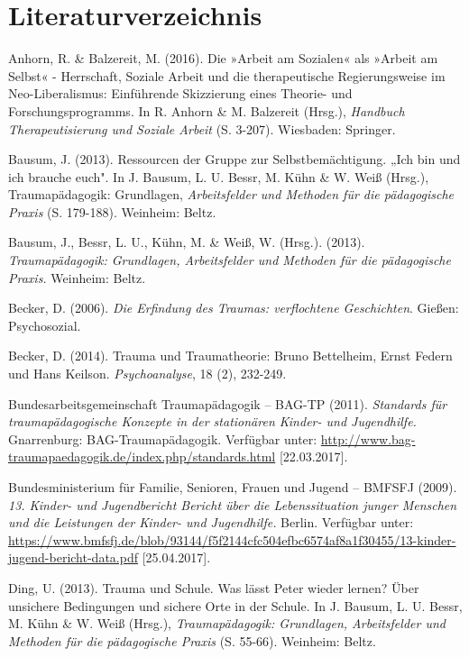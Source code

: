 \section{Literaturverzeichnis}

\hang
Anhorn, R. \& Balzereit, M. (2016). Die »Arbeit am Sozialen« als »Arbeit am Selbst« - Herrschaft, Soziale Arbeit und die therapeutische Regierungsweise im Neo-Liberalismus: Einf{\"u}hrende Skizzierung eines Theorie- und Forschungsprogramms. In R. Anhorn \& M. Balzereit (Hrsg.), \textit{Handbuch Therapeutisierung und Soziale Arbeit} (S. 3-207). Wiesbaden: Springer.

\hang
Bausum, J. (2013). Ressourcen der Gruppe zur Selbstbem{\"a}chtigung. „Ich bin und ich brauche euch". In J. Bausum, L. U. Bessr, M. Kühn \& W. Weiß (Hrsg.), Traumapädagogik: Grundlagen, \textit{Arbeitsfelder und Methoden für die pädagogische Praxis} (S. 179-188). Weinheim: Beltz.

\hang
Bausum, J., Bessr, L. U., Kühn, M. \& Weiß, W. (Hrsg.). (2013). \textit{Traumapädagogik: Grundlagen, Arbeitsfelder und Methoden für die pädagogische Praxis.} Weinheim: Beltz.

\hang
Becker, D. (2006). \textit{Die Erfindung des Traumas: verflochtene Geschichten}. Gießen: Psychosozial.

\hang
Becker, D. (2014). Trauma und Traumatheorie: Bruno Bettelheim, Ernst Federn und Hans Keilson. \textit{Psychoanalyse}, 18 (2), 232-249.

\hang
Bundesarbeitsgemeinschaft Traumap{\"a}dagogik – BAG-TP (2011). \textit{Standards für traumapädagogische Konzepte in der stationären Kinder- und Jugendhilfe.} Gnarrenburg: BAG-Traumapädagogik. Verfügbar unter: \url{http://www.bag-traumapaedagogik.de/index.php/standards.html} [22.03.2017].

\hang
Bundesministerium für Familie, Senioren, Frauen und Jugend – BMFSFJ (2009). \textit{13. Kinder- und Jugendbericht Bericht über die Lebenssituation junger Menschen und die Leistungen der Kinder- und Jugendhilfe.} Berlin. Verfügbar unter: \url{https://www.bmfsfj.de/blob/93144/f5f2144cfc504efbc6574af8a1f30455/13-kinder-jugend-bericht-data.pdf} [25.04.2017].

\hang
Ding, U. (2013). Trauma und Schule. Was l{\"a}sst Peter wieder lernen? {\"U}ber unsichere Bedingungen und sichere Orte in der Schule. In J. Bausum, L. U. Bessr, M. Kühn \& W. Weiß (Hrsg.), \textit{Traumapädagogik: Grundlagen, Arbeitsfelder und Methoden für die pädagogische Praxis} (S. 55-66). Weinheim: Beltz.

